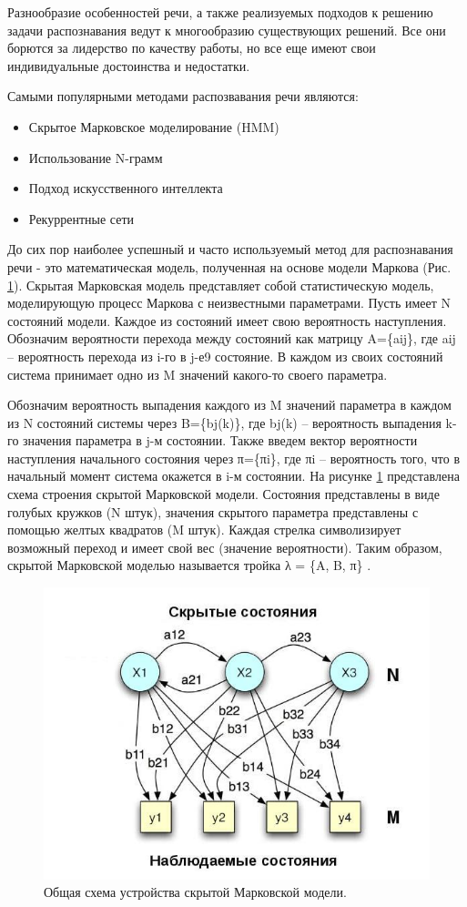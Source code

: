 Разнообразие особенностей речи, а также реализуемых подходов к решению задачи распознавания ведут к многообразию существующих решений. Все они борются за лидерство по качеству работы, но все еще имеют свои индивидуальные достоинства и недостатки.

Самыми популярными методами распозвавания речи являются: 
\begin{itemize}
  \item Скрытое Марковское моделирование (HMM)
  \item Использование N-грамм
  \item Подход искусственного интеллекта
  \item Рекуррентные сети
\end{itemize}

До сих пор наиболее успешный \cite{1_speach} и часто используемый метод для распознавания речи - это математическая модель, полученная на основе модели Маркова (Рис. \ref{pic:speach_1}).
Скрытая Марковская модель представляет собой статистическую модель, моделирующую процесс Маркова с неизвестными параметрами. Пусть имеет N состояний модели. 
Каждое из состояний имеет свою вероятность наступления. Обозначим вероятности перехода между состояний как матрицу A=\{aij\}, где aij – вероятность перехода из i-го в j-е9
состояние. В каждом из своих состояний система принимает одно из M значений какого-то своего параметра. 

Обозначим вероятность выпадения каждого из M значений параметра в каждом из N состояний системы через B=\{bj(k)\}, 
где bj(k) – вероятность выпадения k-го значения параметра в j-м состоянии. Также введем вектор вероятности наступления начального состояния через 
π=\{πi\}, где πi – вероятность того, что в начальный момент система окажется в i-м состоянии. На рисунке \ref{pic:speach_1} представлена схема строения скрытой Марковской модели. 
Состояния представлены в виде голубых кружков (N штук), значения скрытого параметра представлены с помощью желтых квадратов (M штук). 
Каждая стрелка символизирует возможный переход и имеет свой вес (значение вероятности). Таким образом, скрытой Марковской моделью называется тройка λ = \{A, B, π\} \cite{2_speach}.

\begin{figure}[h]
\includegraphics[width=0.75\columnwidth]{./img/speach_1.jpg}
\centering
\caption{Общая схема устройства скрытой Марковской модели. \cite{3_speach}}
\label{pic:speach_1}
\end{figure}

